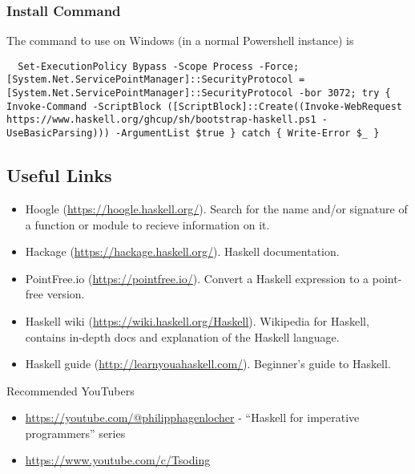 \subsubsection{Install Command}
The command to use on Windows (in a normal Powershell instance) is

\begin{lstlisting}
  Set-ExecutionPolicy Bypass -Scope Process -Force;[System.Net.ServicePointManager]::SecurityProtocol = [System.Net.ServicePointManager]::SecurityProtocol -bor 3072; try { Invoke-Command -ScriptBlock ([ScriptBlock]::Create((Invoke-WebRequest https://www.haskell.org/ghcup/sh/bootstrap-haskell.ps1 -UseBasicParsing))) -ArgumentList $true } catch { Write-Error $_ }
\end{lstlisting}

\subsection{Useful Links}
\begin{itemize}
  \item Hoogle (\url{https://hoogle.haskell.org/}). Search for the name and/or signature of a function or module to recieve information on it.
  \item Hackage (\url{https://hackage.haskell.org/}). Haskell documentation.
  \item PointFree.io (\url{https://pointfree.io/}). Convert a Haskell expression to a point-free version.
  \item Haskell wiki (\url{https://wiki.haskell.org/Haskell}). Wikipedia for Haskell, contains in-depth docs and explanation of the Haskell language.
  \item Haskell guide (\url{http://learnyouahaskell.com/}). Beginner's guide to Haskell.
\end{itemize}

Recommended YouTubers
\begin{itemize}
  \item \url{https://youtube.com/@philipphagenlocher} - ``Haskell for imperative programmers'' series
  \item \url{https://www.youtube.com/c/Tsoding}
\end{itemize}